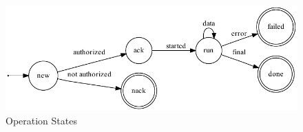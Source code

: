 \begin{figure}
	\begin{center}\includegraphics[width=\myfigwidth,height=\myfigheight,keepaspectratio]{figs/dot/op_states}\end{center}
	\caption{Operation States}
	\label{fig:op-states}
\end{figure}

